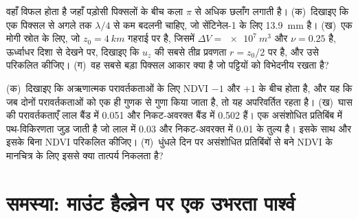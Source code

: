 \begin{exercise}[$\star\star\star$]\label{exo:b3:remote-sensing-gis:11}
 वहाँ विफल होता है जहाँ पड़ोसी पिक्सलों के बीच कला $\pi$ से
अधिक छलाँग लगाती है। (क)~दिखाइए कि एक पिक्सल से अगले तक 
$\lambda/4$ से कम बदलनी चाहिए, जो सेंटिनेल-1 के लिए \qty{13.9}{mm} है।
(ख)~एक मोगी स्रोत के लिए, जो $z_0 = \qty{4}{km}$ गहराई पर है, जिसमें $\Delta V =
\qty{e7}{m^3}$ और $\nu = 0.25$ है, ऊर्ध्वाधर दिशा से देखने पर, दिखाइए कि $u_z$ की
सबसे तीव्र प्रवणता $r = z_0/2$ पर है, और उसे परिकलित कीजिए। (ग)~वह सबसे बड़ा
पिक्सल आकार क्या है जो पट्टियों को विभेदनीय रखता है?
\end{exercise}

\begin{exercise}[$\star\star\star$]\label{exo:b3:remote-sensing-gis:12}
(क)~दिखाइए कि अऋणात्मक परावर्तकताओं के लिए NDVI $-1$ और $+1$ के बीच होता है,
और यह कि जब दोनों परावर्तकताओं को एक ही गुणक से गुणा किया जाता है, तो यह अपरिवर्तित रहता है।
(ख)~घास की परावर्तकताएँ लाल बैंड में 0.051 और
निकट-अवरक्त बैंड में 0.502 हैं। एक असंशोधित प्रतिबिंब में पथ-विकिरणता जुड़ जाती है
जो लाल में 0.03 और निकट-अवरक्त में 0.01 के तुल्य है। इसके साथ और इसके बिना
NDVI परिकलित कीजिए। (ग)~धुंधले दिन पर असंशोधित प्रतिबिंबों से बने NDVI
के मानचित्र के लिए इससे क्या तात्पर्य निकलता है?
\end{exercise}

\section{समस्या: माउंट हैल्व्रेन पर एक उभरता पार्श्व}

